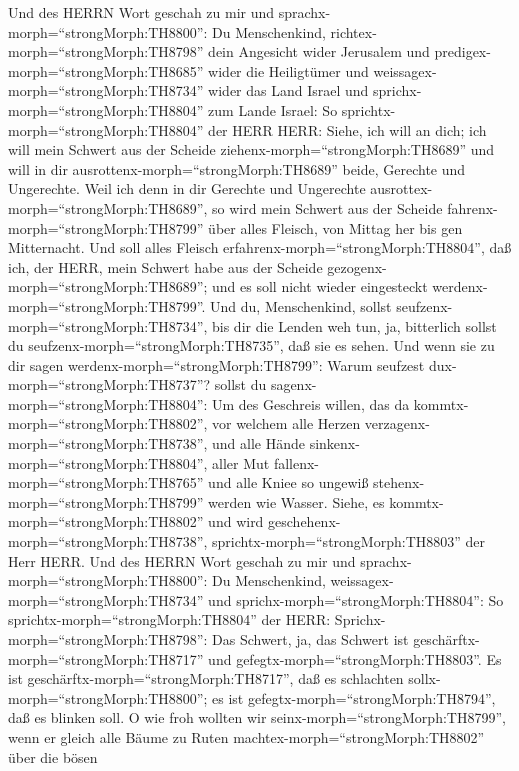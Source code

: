  Und des HERRN Wort geschah zu mir und
sprachx-morph=``strongMorph:TH8800'':  Du Menschenkind,
richtex-morph=``strongMorph:TH8798'' dein Angesicht wider Jerusalem und
predigex-morph=``strongMorph:TH8685'' wider die Heiligtümer und
weissagex-morph=``strongMorph:TH8734'' wider das Land Israel
 und sprichx-morph=``strongMorph:TH8804'' zum Lande Israel:
So sprichtx-morph=``strongMorph:TH8804'' der HERR HERR: Siehe, ich will
an dich; ich will mein Schwert aus der Scheide
ziehenx-morph=``strongMorph:TH8689'' und will in dir
ausrottenx-morph=``strongMorph:TH8689'' beide, Gerechte und Ungerechte.
 Weil ich denn in dir Gerechte und Ungerechte
ausrottex-morph=``strongMorph:TH8689'', so wird mein Schwert aus der
Scheide fahrenx-morph=``strongMorph:TH8799'' über alles Fleisch, von
Mittag her bis gen Mitternacht.  Und soll alles Fleisch
erfahrenx-morph=``strongMorph:TH8804'', daß ich, der HERR, mein Schwert
habe aus der Scheide gezogenx-morph=``strongMorph:TH8689''; und es soll
nicht wieder eingesteckt werdenx-morph=``strongMorph:TH8799''.
 Und du, Menschenkind, sollst
seufzenx-morph=``strongMorph:TH8734'', bis dir die Lenden weh tun, ja,
bitterlich sollst du seufzenx-morph=``strongMorph:TH8735'', daß sie es
sehen.  Und wenn sie zu dir sagen
werdenx-morph=``strongMorph:TH8799'': Warum seufzest
dux-morph=``strongMorph:TH8737''? sollst du
sagenx-morph=``strongMorph:TH8804'': Um des Geschreis willen, das da
kommtx-morph=``strongMorph:TH8802'', vor welchem alle Herzen
verzagenx-morph=``strongMorph:TH8738'', und alle Hände
sinkenx-morph=``strongMorph:TH8804'', aller Mut
fallenx-morph=``strongMorph:TH8765'' und alle Kniee so ungewiß
stehenx-morph=``strongMorph:TH8799'' werden wie Wasser. Siehe, es
kommtx-morph=``strongMorph:TH8802'' und wird
geschehenx-morph=``strongMorph:TH8738'',
sprichtx-morph=``strongMorph:TH8803'' der Herr HERR.  Und
des HERRN Wort geschah zu mir und sprachx-morph=``strongMorph:TH8800'':
 Du Menschenkind, weissagex-morph=``strongMorph:TH8734'' und
sprichx-morph=``strongMorph:TH8804'': So
sprichtx-morph=``strongMorph:TH8804'' der HERR:
Sprichx-morph=``strongMorph:TH8798'': Das Schwert, ja, das Schwert ist
geschärftx-morph=``strongMorph:TH8717'' und
gefegtx-morph=``strongMorph:TH8803''.  Es ist
geschärftx-morph=``strongMorph:TH8717'', daß es schlachten
sollx-morph=``strongMorph:TH8800''; es ist
gefegtx-morph=``strongMorph:TH8794'', daß es blinken soll. O wie froh
wollten wir seinx-morph=``strongMorph:TH8799'', wenn er gleich alle
Bäume zu Ruten machtex-morph=``strongMorph:TH8802'' über die bösen
